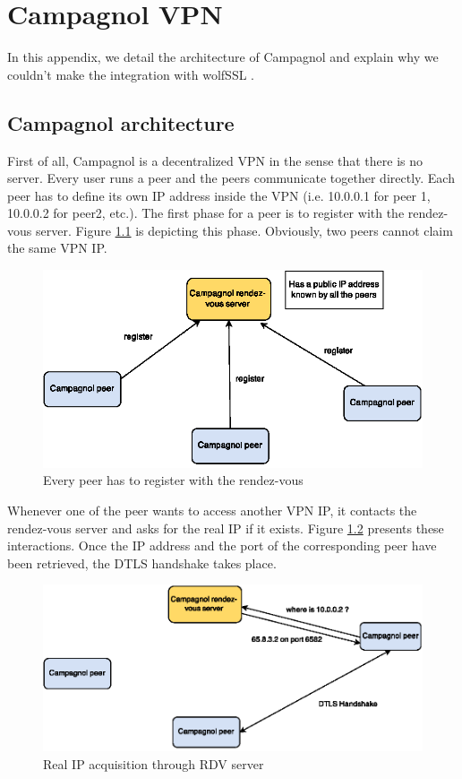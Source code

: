 \chapter{Campagnol VPN}
\label{app:campagnol}

In this appendix, we detail the architecture of Campagnol \cite{campagnol} and explain why we couldn't make the integration with wolfSSL \cite{wolfssl}.

\section{Campagnol architecture}

First of all, Campagnol is a decentralized VPN in the sense that there is no server. Every user runs a peer and the peers communicate together directly. Each peer has to define its own IP address inside the VPN (i.e. 10.0.0.1 for peer 1, 10.0.0.2 for peer2, etc.). The first phase for a peer is to register with the rendez-vous server. Figure \ref{fig:campagnol-rdv} is depicting this phase. Obviously, two peers cannot claim the same VPN IP.


\begin{figure}[!ht]
\centering
\includegraphics{images/campagnol-rdv.eps}
\caption{Every peer has to register with the rendez-vous}
\label{fig:campagnol-rdv}
\end{figure}

Whenever one of the peer wants to access another VPN IP, it contacts the rendez-vous server and asks for the real IP if it exists. Figure \ref{fig:campagnol-rdv2} presents these interactions. Once the IP address and the port of the corresponding peer have been retrieved, the DTLS handshake takes place.

\begin{figure}[!ht]
\centering
\includegraphics{images/campagnol-rdv2.eps}
\caption{Real IP acquisition through RDV server}
\label{fig:campagnol-rdv2}
\end{figure}

